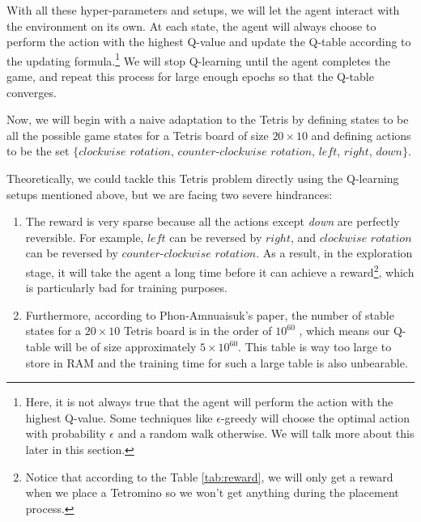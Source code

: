 \documentclass[letterpaper]{article} %
\begin{document}
With all these hyper-parameters and setups, we will let the agent interact with the environment on its own. At each state, the agent will always choose to perform the action with the highest Q-value and update the Q-table according to the updating formula.\footnote{Here, it is not always true that the agent will perform the action with the highest Q-value. Some techniques like $\epsilon$-greedy will choose the optimal action with probability $\epsilon$ and a random walk otherwise. We will talk more about this later in this section.} We will stop Q-learning until the agent completes the game, and repeat this process for large enough epochs so that the Q-table converges.



Now, we will begin with a naive adaptation to the Tetris by defining states to be all the possible game states for a Tetris board of size $20\times 10$ and defining actions to be the set $\{clockwise\,\,rotation$, $counter\textit{-}clockwise\,\,rotation$, $left$, $right$, $down\}$.

Theoretically, we could tackle this Tetris problem directly using the Q-learning setups mentioned above, but we are facing two severe hindrances:
\begin{enumerate}
  \item The reward is very sparse because all the actions except {\it down} are perfectly reversible. For example, $left$ can be reversed by $right$, and $clockwise\,\,rotation$ can be reversed by $counter\textit{-}clockwise\,\,rotation$. As a result, in the exploration stage, it will take the agent a long time before it can achieve a reward\footnote{Notice that according to the Table \ref{tab:reward}, we will only get a reward when we place a Tetromino so we won't get anything during the placement process.}, which is particularly bad for training purposes.
  \item Furthermore, according to Phon-Amnuaisuk's paper, the number of stable states for a $20\times 10$ Tetris board is in the order of $10^{60}$ \cite{somnuk_2015}, which means our Q-table will be of size approximately $5\times 10^{60}$. This table is way too large to store in RAM and the training time for such a large table is also unbearable.
\end{enumerate}
\end{document}

